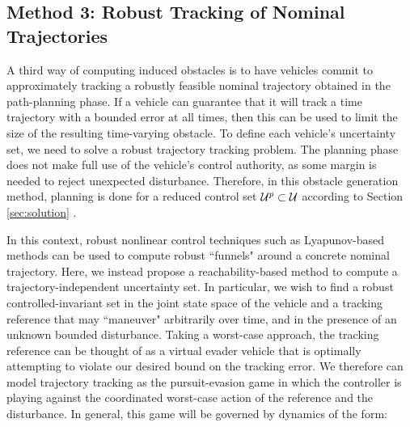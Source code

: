 \subsection{Method 3: Robust Tracking of Nominal Trajectories}
A third way of computing induced obstacles is to have vehicles commit to approximately tracking a robustly feasible nominal trajectory obtained in the path-planning phase. If a vehicle can guarantee that it will track a time trajectory with a bounded error at all times, then this can be used to limit the size of the resulting time-varying obstacle. To define each vehicle's uncertainty set, we need to solve a robust trajectory tracking problem.
The planning phase does not make full use of the vehicle's control authority, as some margin is needed to reject unexpected disturbance. Therefore, in this obstacle generation method, planning is done for a reduced control set $\mathcal{U}^p\subset\mathcal{U}$ according to Section \ref{sec:solution} .


In this context, robust nonlinear control techniques such as Lyapunov-based methods
\cite{Majumdar2013}%
can be used to compute robust ``funnels" around a concrete nominal trajectory.
Here, we instead propose a reachability-based method to compute a trajectory-independent uncertainty set. In particular, we wish to find a robust controlled-invariant set in the joint state space of the vehicle and a tracking reference that may ``maneuver" arbitrarily over time, and in the presence of an unknown bounded disturbance. Taking a worst-case approach, the tracking reference can be thought of as a virtual evader vehicle that is optimally attempting to violate our desired bound on the tracking error. We therefore can model trajectory tracking as the pursuit-evasion game in which the controller is playing against the coordinated worst-case action of the reference and the disturbance. In general, this game will be governed by dynamics of the form:

